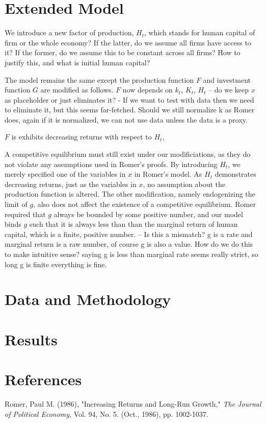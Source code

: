 \documentclass{article}
\begin{document}
\section{Extended Model}

We introduce a new factor of production, $H_t$, which stands for human capital of firm or the whole economy? If the latter, do we assume all firms have access to it? If the former, do we assume this to be constant across all firms? How to justify this, and what is initial human capital?

The model remains the same except the production function $F$ and investment function $G$ are modified as follows. $F$ now depends on $k_t$, $K_t$, $H_t$ -- do we keep $x$ as placeholder or just eliminates it? - If we want to test with data then we need to eliminate it, but this seems far-fetched. Should we still normalize k as Romer does, again if it is normalized, we can not use data unless the data is a proxy. 

$F$ is exhibits decreasing returns with respect to $H_t$, 

A competitive equilibrium must still exist under our modificiations, as they do not violate any assumptions used in Romer's proofs. By introducing $H_t$, we merely specified one of the variables in $x$ in Romer's model. As $H_t$ demonstrates decreasing returns, just as the variables in $x$, no assumption about the production function is altered. The other modification, namely endogenizing the limit of $g$, also does not affect the existence of a competitive equilibrium. Romer required that $g$ always be bounded by some positive number, and our model binds $g$ such that it is always less than than the marginal return of human capital, which is a finite, positive number. -- Is this a mismatch? g is a rate and marginal return is a raw number, of course g is also a value. How do we do this to make intuitive sense? saying g is less than marginal rate seems really strict, so long g is finite everything is fine. 

\section{Data and Methodology}

\section{Results}


\section{References}
Romer, Paul M. (1986), "Increasing Returns and Long-Run Growth," \textit{The Journal of Political Economy}, Vol. 94, No. 5. (Oct., 1986), pp. 1002-1037.
\end{document}
